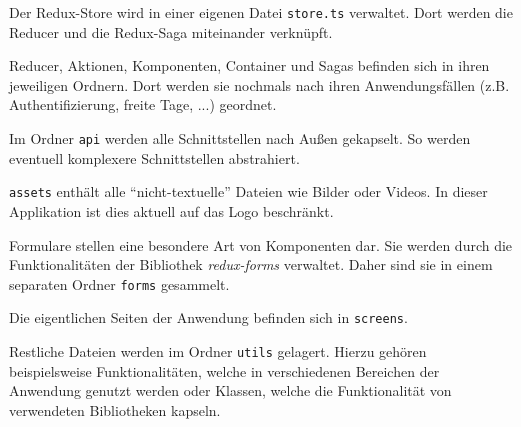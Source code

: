 Der Redux-Store wird in einer eigenen Datei \texttt{store.ts} verwaltet.
Dort werden die Reducer und die Redux-Saga miteinander verknüpft.

Reducer, Aktionen, Komponenten, Container und Sagas befinden sich in ihren jeweiligen Ordnern.
Dort werden sie nochmals nach ihren Anwendungsfällen (z.B. Authentifizierung, freite Tage, ...) geordnet.

Im Ordner \texttt{api} werden alle Schnittstellen nach Außen gekapselt.
So werden eventuell komplexere Schnittstellen abstrahiert.

\texttt{assets} enthält alle \enquote{nicht-textuelle} Dateien wie Bilder oder Videos.
In dieser Applikation ist dies aktuell auf das Logo beschränkt.

Formulare stellen eine besondere Art von Komponenten dar.
Sie werden durch die Funktionalitäten der Bibliothek \emph{redux-forms} verwaltet.
Daher sind sie in einem separaten Ordner \texttt{forms} gesammelt.

Die eigentlichen Seiten der Anwendung befinden sich in \texttt{screens}.

Restliche Dateien werden im Ordner \texttt{utils} gelagert.
Hierzu gehören beispielsweise Funktionalitäten, welche in verschiedenen Bereichen der Anwendung genutzt werden
oder Klassen, welche die Funktionalität von verwendeten Bibliotheken kapseln.


